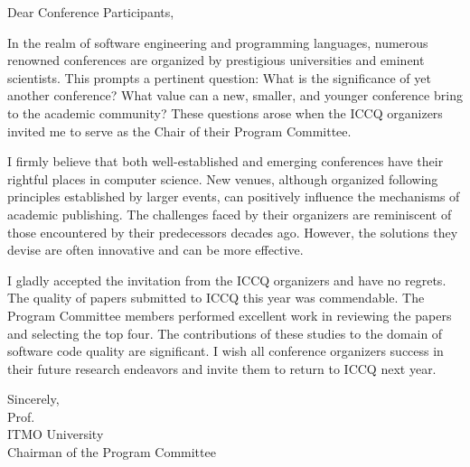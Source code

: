 \cleardoublepage
{}

Dear Conference Participants,

In the realm of software engineering and programming languages, numerous
renowned conferences are organized by prestigious universities and eminent
scientists. This prompts a pertinent question: What is the significance of yet
another conference? What value can a new, smaller, and younger conference bring
to the academic community? These questions arose when the ICCQ organizers
invited me to serve as the Chair of their Program Committee.

I firmly believe that both well-established and emerging conferences have their
rightful places in computer science. New venues, although organized following
principles established by larger events, can positively influence the
mechanisms of academic publishing. The challenges faced by their organizers are
reminiscent of those encountered by their predecessors decades ago. However,
the solutions they devise are often innovative and can be more effective.

I gladly accepted the invitation from the ICCQ organizers and have no regrets.
The quality of papers submitted to ICCQ this year was commendable. The Program
Committee members performed excellent work in reviewing the papers and
selecting the top four. The contributions of these studies to the domain of
software code quality are significant. I wish all conference organizers success
in their future research endeavors and invite them to return to ICCQ next
year.

\vspace{18pt}
Sincerely,\\
Prof. \\
ITMO University \\
Chairman of the Program Committee \\
